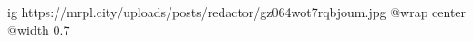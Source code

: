  
 
 
 
 

\ifcmt
  ig https://mrpl.city/uploads/posts/redactor/gz064wot7rqbjoum.jpg
  @wrap center
  @width 0.7
\fi
